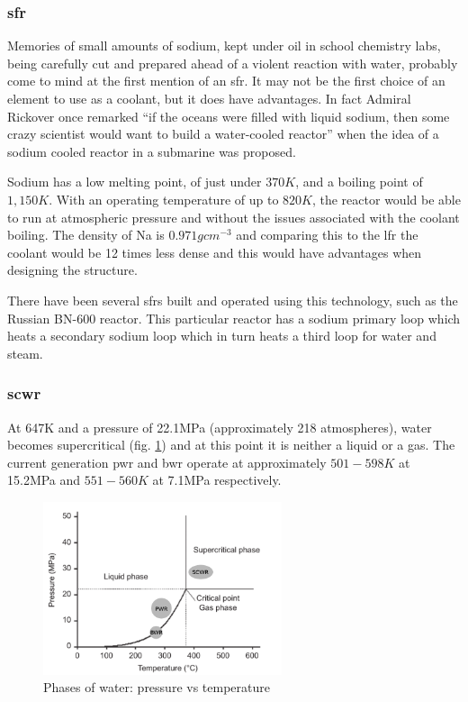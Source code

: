 \FloatBarrier
\subsubsection{\acrshort{sfr}}

Memories of small amounts of sodium, kept under oil in school chemistry labs, being carefully cut and prepared ahead of a violent reaction with water, probably come to mind at the first mention of an \acrfull{sfr}.  It may not be the first choice of an element to use as a coolant, but it does have advantages.  In fact Admiral Rickover once remarked \enquote{if the oceans were filled with liquid sodium, then some crazy scientist would want to build a water-cooled reactor} when the idea of a sodium cooled reactor in a submarine was proposed\cite{atomicaccidents}.

Sodium has a low melting point, of just under $370K$, and a boiling point of $1,150K$.  With an operating temperature of up to $820K$, the reactor would be able to run at atmospheric pressure and without the issues associated with the coolant boiling.  The density of Na is $0.971 gcm^{-3}$ and comparing this to the \acrshort{lfr} the coolant would be 12 times less dense and this would have advantages when designing the structure.

There have been several \acrshort{sfr}s built and operated using this technology, such as the Russian BN-600 reactor.  This particular reactor has a sodium primary loop which heats a secondary sodium loop which in turn heats a third loop for water and steam.




\subsubsection{\acrshort{scwr}}

At 647K and a pressure of 22.1MPa (approximately 218 atmospheres), water becomes \gls{supercritical} (fig. \ref{fig:waterphasespressuretemp}) and at this point it is neither a liquid or a gas\cite{advancedbiomass}.  The current generation \acrshort{pwr} and \acrshort{bwr} operate at approximately $501-598K$ at 15.2MPa\cite{ocw01} and $551-560K$ at 7.1MPa\cite{ocw02} respectively.

\begin{figure}[tbp]
  \begin{center}
    \includegraphics[width=7.0cm]{chapters/introduction/images/water_phase_diagram.png}
    \caption{Phases of water:  pressure vs temperature}
    \label{fig:waterphasespressuretemp}
  \end{center}
\end{figure}

